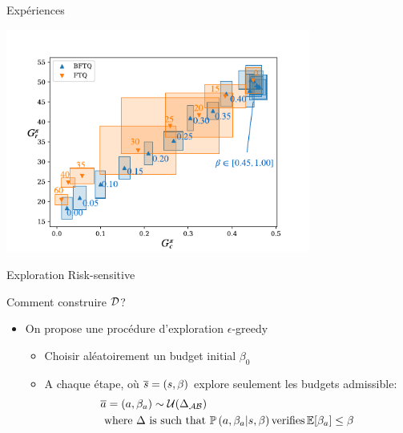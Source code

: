 \documentclass[french,handout]{beamer}
\begin{document}
    \begin{frame}{Expériences}
        \begin{center}
            \includegraphics[width=0.75\textwidth]{img/slot-filling.pdf}
        \end{center}
    \end{frame}

    \begin{frame}{Exploration Risk-sensitive}

        Comment construire $\mathcal{D}$?

        \begin{itemize}
            \item On propose une procédure d'exploration $\epsilon$-greedy
            \begin{itemize}
                \pause\item Choisir aléatoirement un budget initial $\beta_0$
                \pause\item A chaque étape, où $\overline{s}=(s,\beta)$ explore seulement les budgets admissible:
                \pause\begin{align*}
                          &\overline{a} = (a, \beta_a)\sim\mathcal{U}(\Delta_{\mathcal{A}\mathcal{B}})\\
                          &\text{ where }  \Delta \text{ is such that }\mathbb{P}\left(a, \beta_a|s, \beta\right) \text{verifies} \operatorname*{\mathbb{E}}[\beta_a]\leq\beta
                \end{align*}
            \end{itemize}
        \end{itemize}


    \end{frame}
\end{document}
